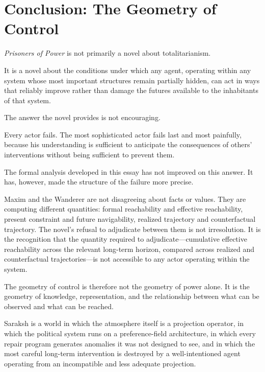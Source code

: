 \documentclass[12pt, a4paper]{article}
\theoremstyle{plain}
\theoremstyle{definition}
\theoremstyle{remark}
\begin{document}
\section*{Conclusion: The Geometry of Control}

\textit{Prisoners of Power} is not primarily a
novel about totalitarianism.

It is a novel about the conditions under which
any agent, operating within any system whose most
important structures remain partially hidden, can
act in ways that reliably improve rather than
damage the futures available to the inhabitants
of that system.

The answer the novel provides is not encouraging.

Every actor fails. The most sophisticated actor
fails last and most painfully, because his
understanding is sufficient to anticipate the
consequences of others' interventions without
being sufficient to prevent them.

The formal analysis developed in this essay has
not improved on this answer. It has, however,
made the structure of the failure more precise.

Maxim and the Wanderer are not disagreeing about
facts or values. They are computing different
quantities: formal reachability and effective
reachability, present constraint and future
navigability, realized trajectory and counterfactual
trajectory. The novel's refusal to adjudicate
between them is not irresolution. It is the
recognition that the quantity required to
adjudicate---cumulative effective reachability
across the relevant long-term horizon, compared
across realized and counterfactual
trajectories---is not accessible to any actor
operating within the system.

The geometry of control is therefore not the
geometry of power alone. It is the geometry of
knowledge, representation, and the relationship
between what can be observed and what can be
reached.

Saraksh is a world in which the atmosphere itself
is a projection operator, in which the political
system runs on a preference-field architecture,
in which every repair program generates anomalies
it was not designed to see, and in which the most
careful long-term intervention is destroyed by
a well-intentioned agent operating from an
incompatible and less adequate projection.
\end{document}
